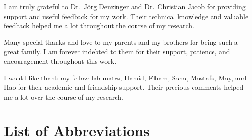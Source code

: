 \documentclass{ucalgthes1}
\theoremstyle{plain}
\theoremstyle{definition}
\begin{document}
I am truly grateful to Dr.~J{\"o}rg Denzinger and Dr.~Christian Jacob for providing support and useful feedback for my work. Their technical knowledge and valuable feedback helped me a lot throughout the course of my research.

Many special thanks and love to my parents and my brothers for being such a great family. I am forever indebted to them for their support, patience, and encouragement throughout this work.


I would like thank my fellow lab-mates, Hamid, Elham, Soha, Mostafa, May, and Hao for their academic and friendship support. Their precious comments helped me a lot over the course of my research.


\begin{singlespace}
\newpage
{}
\tableofcontents
\pagestyle{plain}
\newpage
{}
\listoftables
\pagestyle{plain}
\newpage
{}
\listoffigures
\pagestyle{plain}
\clearpage
\clearpage          %
\end{singlespace}
\newpage
{}
\chapter*{\bf{List of Abbreviations}\hfill}
\listofsymbols
\pagestyle{plain}
\clearpage



\setcounter{page}{1}












\global\def\newblock{\hskip .11em plus .33em minus -.07em} %
\end{document}
